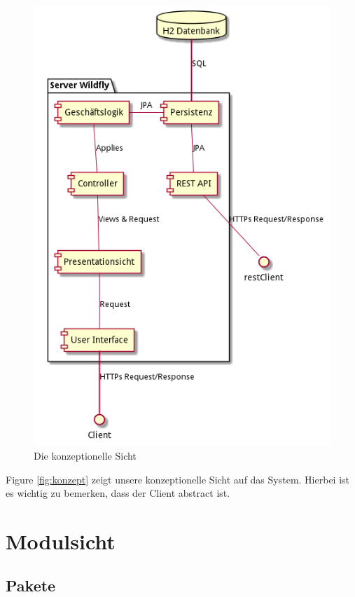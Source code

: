 \documentclass[enabledeprecatedfontcommands,fontsize=12pt,paper=a4,twoside]{scrartcl}
\begin{document}
\begin{figure}
  \includegraphics[width=\linewidth]{UML/konzeptionelleSicht.png}
  \caption{Die konzeptionelle Sicht}
  \label{fig:boat1}
\end{figure}

Figure \ref{fig:konzept} zeigt unsere konzeptionelle Sicht auf das System. 
Hierbei ist es wichtig zu bemerken, dass der Client abstract ist.
\section{Modulsicht}
\label{sec:modulsicht}

\subsection{Pakete}
\end{document}
